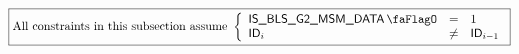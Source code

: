\[
    \boxed{\text{All constraints in this subsection assume }
        \left\{ \begin{array}{lcl}
            \isBlsGTwoMsmData      & =    & 1            \\
            \blsId_{i}             & \neq & \blsId_{i-1} \\
        \end{array} \right.
    }
\]
